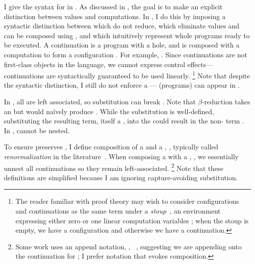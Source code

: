 I give the syntax for \tlang in .
As discussed in , the goal is to make an explicit
distinction between values and computations.
In \tlang, I do this by imposing a syntactic distinction between
 \im{\tV} which do not reduce,
 \im{\tN} which
eliminate values and can be composed
using  \im{\tK}, and
 \im{\tM} which
intuitively represent whole programs ready to be executed.
A continuation \im{\tK} is a program with a hole, and is composed
\im{\tK\hw{\tN}} with a computation \im{\tN} to form a configuration \im{\tM}.
For example, \im{(\tlete{\tx}{\hole}{\tsnde{\tx}})\hw{\tN} =
  \tlete{\tx}{\tN}{\tsnde{\tx}}}.
Since continuations are not first-class objects in the language, we cannot
express control effects---continuations are syntactically guaranteed to be used
linearly.
%
\footnote{The reader familiar with proof theory
  may wish to consider configurations and continuations as the same term under a
  \emph{stoup}~\cite{girard1991}, an environment expressing either zero or one
  linear computation variables \im{\hole}; when the stoup is empty, we have a
  configuration and otherwise we have a continuation.}
%
Note that despite the syntactic distinction, I still do not enforce a
--- (programs) can
appear in .

\FigECCAHetero
In , all  are left associated, so substitution can
break .
Note that \(\beta\)-reduction takes an  
\im{\tK\hw{\tappe{(\tfune{\tx}{\tA}{\tM})}{\tV}}} but would na\"ively produce
\im{\tK\hw{\subst{\tM}{\tV}{\tx}}}.
While the substitution \im{\subst{\tM}{\tV}{\tx}} is well-defined, substituting
the resulting term, itself a \emph{}, into the
 \im{\tK} could result in the non- term
\im{\tlete{\tx}{\tM}{\tMpr}}.
In ,  cannot be nested.

To ensure  preserves , I define composition of a
 \im{\tK} and a  \im{\tM},
, typically called \emph{renormalization} in the
literature~\cite{sabry1997:on-cbv,kennedy2007}.
When composing a  with a ,
\im{\tK\hhw{\tM}}, we essentially unnest all continuations so they remain
left-associated.%
\footnote{
  Some work uses an append notation, \eg, \im{\tM ::
    \tK}~\cite{sabry1997:on-cbv}, suggesting we are appending \im{\tK} onto the
  continuation for \im{\tM}; I prefer notation that evokes composition.
}
Note that these definitions are simplified because I am ignoring
capture-avoiding substitution.

